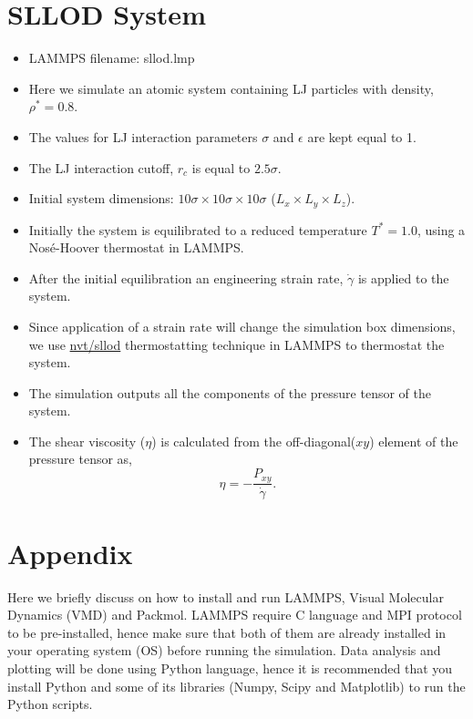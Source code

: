 \documentclass[12pt]{article}
\begin{document}
\section{SLLOD System}
\begin{itemize}
\item LAMMPS filename: sllod.lmp
\item Here we simulate an atomic system containing LJ particles with density, $\rho^{*} = 0.8$.
\item The values for LJ interaction parameters $\sigma$ and $\epsilon$ are kept equal to 1.
\item The LJ interaction cutoff, $r_c$ is equal to $2.5\sigma$.
\item Initial system dimensions: $10\sigma \times 10\sigma \times 10\sigma$ 
($L_{x} \times L_{y} \times L_{z}$).
\item Initially the system is equilibrated to a reduced temperature $T^{*} = 1.0$, 
using a Nos\'e-Hoover thermostat in LAMMPS.
\item After the initial equilibration an engineering strain rate, $\dot{\gamma}$ is 
applied to the system.
\item Since application of a strain rate will change the simulation box dimensions, we use 
\href{https://docs.lammps.org/fix_nvt_sllod.html}{nvt/sllod} thermostatting technique in LAMMPS
to thermostat the system.
\item The simulation outputs all the components of the pressure tensor of the system.
\item The shear viscosity ($\eta$) is calculated from the off-diagonal($xy$) element of the pressure tensor
as,
$$ \eta = -\frac{P_{xy}}{\dot{\gamma}}.$$

\end{itemize}

\appendix

\section{Appendix}
Here we briefly discuss on how to install and run LAMMPS, Visual Molecular Dynamics (VMD) and Packmol.
LAMMPS require C language and MPI protocol to be pre-installed, hence make sure that 
both of them are already installed in your operating system (OS) before running the simulation.
Data analysis and plotting will be done using Python language, hence it is recommended that you 
install Python and some of its libraries (Numpy, Scipy and Matplotlib) to run the Python scripts.
\end{document}
